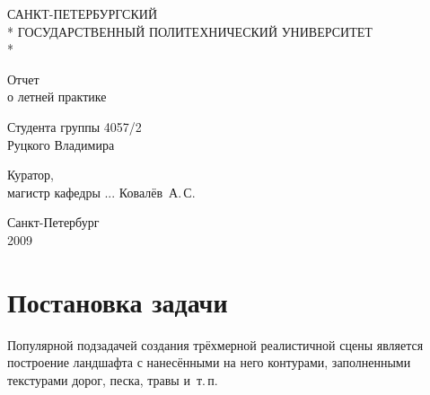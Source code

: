 \documentclass[a4paper,12pt,titlepage]{report}
\begin{document}
\begin{titlepage}
\newpage

\begin{center}
САНКТ-ПЕТЕРБУРГСКИЙ \\*
ГОСУДАРСТВЕННЫЙ ПОЛИТЕХНИЧЕСКИЙ УНИВЕРСИТЕТ \\*
\hrulefill
\end{center}


\vspace{1cm}
\vspace{8em}

\begin{center}
\Large{Отчет \\ о летней практике}
\end{center}

\vspace{2.5em}

\begin{center}
Студента группы 4057/2 \\ Руцкого Владимира
\end{center}

\vspace{12em}

\begin{flushleft}
Куратор, \\
магистр кафедры ...  \hfill Ковалёв~А.\,С.
\end{flushleft}

\vspace{\fill}

\begin{center}
Санкт-Петербург \\ 2009
\end{center}

\end{titlepage}
\pagebreak


\section*{Постановка задачи}
Популярной подзадачей создания трёхмерной реалистичной сцены является построение ландшафта 
с нанесёнными на него контурами, заполненными текстурами дорог, песка, травы и~т.\,п.
\end{document}
